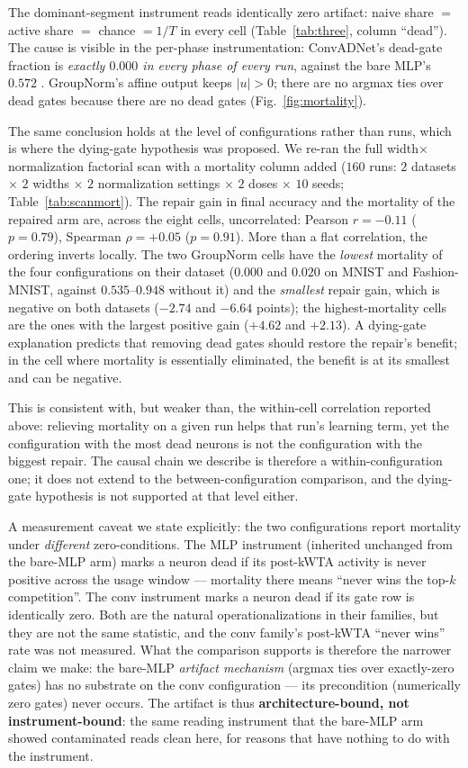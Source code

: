 \documentclass[10pt]{article}
\begin{document}
The dominant-segment instrument reads identically zero artifact:
naive share $=$ active share $=$ chance $= 1/T$ in every cell
(Table~\ref{tab:three}, column ``dead''). The cause is visible in the
per-phase instrumentation: ConvADNet's dead-gate fraction is
\emph{exactly $0.000$ in every phase of every run}, against the bare
MLP's $0.572$ . GroupNorm's affine output keeps
$|u| > 0$; there are no argmax ties over dead gates because there are
no dead gates (Fig.~\ref{fig:mortality}).

The same conclusion holds at the level of configurations rather than
runs, which is where the dying-gate hypothesis was proposed. We
re-ran the full width$\times$normalization factorial scan with a
mortality column added ($160$ runs: $2$ datasets $\times$ $2$ widths
$\times$ $2$ normalization settings $\times$ $2$ doses $\times$ $10$
seeds; Table~\ref{tab:scanmort}). The repair gain in final accuracy
and the mortality of the repaired arm are, across the eight cells,
uncorrelated: Pearson $r = -0.11$ ($p = 0.79$), Spearman
$\rho = +0.05$ ($p = 0.91$). More than a flat correlation, the ordering
inverts locally. The two GroupNorm cells have the \emph{lowest}
mortality of the four configurations on their dataset ($0.000$ and
$0.020$ on MNIST and Fashion-MNIST, against $0.535$--$0.948$ without
it) and the \emph{smallest} repair gain, which is negative on both
datasets ($-2.74$ and $-6.64$ points); the highest-mortality cells are
the ones with the largest positive gain ($+4.62$ and $+2.13$). A
dying-gate explanation predicts that removing dead gates should
restore the repair's benefit; in the cell where mortality is
essentially eliminated, the benefit is at its smallest and can be
negative.

This is consistent with, but weaker than, the within-cell correlation
reported above: relieving mortality on a given run helps that run's
learning term, yet the configuration with the most dead neurons is not
the configuration with the biggest repair. The causal chain we
describe is therefore a within-configuration one; it does not extend to
the between-configuration comparison, and the dying-gate hypothesis is
not supported at that level either.

A measurement caveat we state explicitly: the two configurations
report mortality under \emph{different} zero-conditions. The MLP
instrument (inherited unchanged from the bare-MLP arm) marks a neuron dead if its
post-kWTA activity is never positive across the usage window ---
mortality there means ``never wins the top-$k$ competition''. The
conv instrument marks a neuron dead if its gate row is identically
zero. Both are the natural operationalizations in their families,
but they are not the same statistic, and the conv family's
post-kWTA ``never wins'' rate was not measured. What the comparison
supports is therefore the narrower claim we make: the bare-MLP
\emph{artifact mechanism} (argmax ties over exactly-zero gates) has
no substrate on the conv configuration --- its precondition
(numerically zero gates) never occurs. The artifact is thus
\textbf{architecture-bound, not instrument-bound}: the same reading
instrument that the bare-MLP arm showed contaminated reads clean here, for reasons
that have nothing to do with the instrument.
\end{document}
